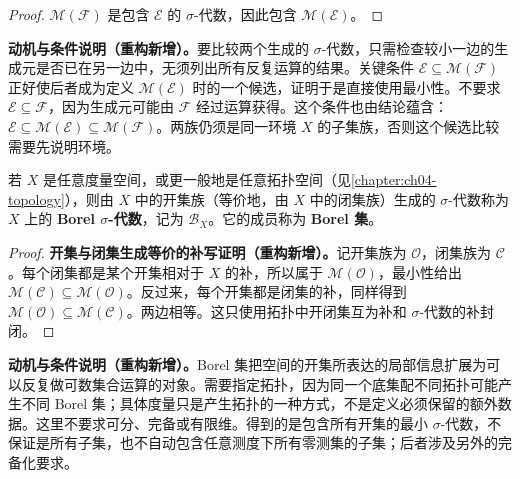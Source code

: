 \documentclass[../../main.tex]{subfiles}%
\begin{document}
\begin{proof}
$\mathscr{M}(\mathscr{F})$ 是包含 $\mathscr{E}$ 的 $\sigma$-代数，因此包含 $\mathscr{M}(\mathscr{E})$。
\end{proof}
\begin{remark}
\textbf{动机与条件说明（重构新增）。}要比较两个生成的 $\sigma$-代数，只需检查较小一边的生成元是否已在另一边中，无须列出所有反复运算的结果。关键条件 $\mathscr{E}\subseteq\mathscr{M}(\mathscr{F})$ 正好使后者成为定义 $\mathscr{M}(\mathscr{E})$ 时的一个候选，证明于是直接使用最小性。不要求 $\mathscr{E}\subseteq\mathscr{F}$，因为生成元可能由 $\mathscr{F}$ 经过运算获得。这个条件也由结论蕴含：$\mathscr{E}\subseteq\mathscr{M}(\mathscr{E})\subseteq\mathscr{M}(\mathscr{F})$。两族仍须是同一环境 $X$ 的子集族，否则这个候选比较需要先说明环境。
\end{remark}



\begin{definition}\label{definition:ch01-borel-definition}
若 $X$ 是任意度量空间，或更一般地是任意拓扑空间（见\cref{chapter:ch04-topology}），则由 $X$ 中的开集族（等价地，由 $X$ 中的闭集族）生成的 $\sigma$-代数称为 $X$ 上的 \textbf{Borel $\sigma$-代数}，记为 $\mathscr{B}_X$。它的成员称为 \textbf{Borel 集}。
\end{definition}
\begin{proof}
\textbf{开集与闭集生成等价的补写证明（重构新增）。}记开集族为 $\mathscr{O}$，闭集族为 $\mathscr{C}$。每个闭集都是某个开集相对于 $X$ 的补，所以属于 $\mathscr{M}(\mathscr{O})$，最小性给出 $\mathscr{M}(\mathscr{C})\subseteq\mathscr{M}(\mathscr{O})$。反过来，每个开集都是闭集的补，同样得到 $\mathscr{M}(\mathscr{O})\subseteq\mathscr{M}(\mathscr{C})$。两边相等。这只使用拓扑中开闭集互为补和 $\sigma$-代数的补封闭。
\end{proof}
\begin{remark}
\textbf{动机与条件说明（重构新增）。}Borel 集把空间的开集所表达的局部信息扩展为可以反复做可数集合运算的对象。需要指定拓扑，因为同一个底集配不同拓扑可能产生不同 Borel 集；具体度量只是产生拓扑的一种方式，不是定义必须保留的额外数据。这里不要求可分、完备或有限维。得到的是包含所有开集的最小 $\sigma$-代数，不保证是所有子集，也不自动包含任意测度下所有零测集的子集；后者涉及另外的完备化要求。
\end{remark}
\end{document}
